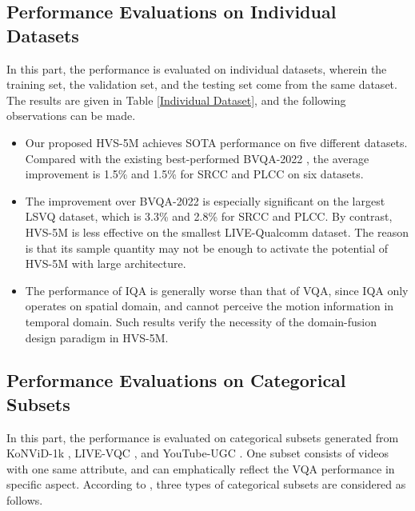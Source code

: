 \documentclass[journal]{IEEEtran}
\begin{document}
\subsection{Performance Evaluations on Individual Datasets} \label{individual datasets}
In this part, the performance is evaluated on individual datasets, wherein the training set, the validation set, and the testing set come from the same dataset. The results are given in Table \ref{Individual Dataset}, and the following observations can be made.



\begin{itemize}
\item Our proposed HVS-5M achieves SOTA performance on five different datasets. Compared with the existing best-performed BVQA-2022 \cite{Li2022}, the average improvement is 1.5\% and 1.5\% for SRCC and PLCC on six datasets.




\item The improvement over BVQA-2022 is especially significant on the largest LSVQ dataset, which is 3.3\% and 2.8\% for SRCC and PLCC. By contrast, HVS-5M is less effective on the smallest LIVE-Qualcomm dataset. The reason is that its sample quantity may not be enough to activate the potential of HVS-5M with large architecture.


\item The performance of IQA is generally worse than that of VQA, since IQA only operates on spatial domain, and cannot perceive the motion information in temporal domain.
    Such results verify the necessity of the  domain-fusion design paradigm in HVS-5M.
\end{itemize}







\subsection{Performance Evaluations on Categorical Subsets} \label{categorical subsets}

In this part, the performance is evaluated on categorical subsets generated from KoNViD-1k \cite{KoNViD-1k}, LIVE-VQC \cite{LIVE-VQC}, and YouTube-UGC \cite{YouTube-UGC}.
One subset consists of videos with one same attribute, and can emphatically reflect the VQA performance in specific aspect.
According to \cite{VIDEVAL}, three types of categorical subsets are considered as follows.
\end{document}
